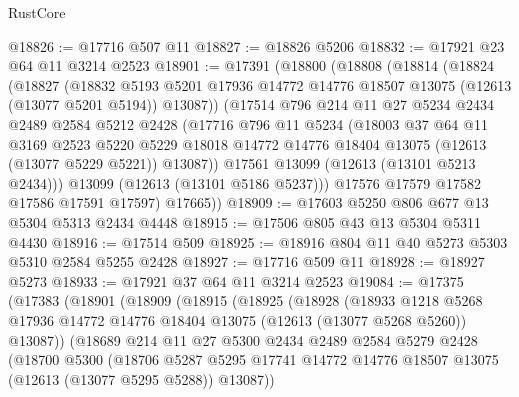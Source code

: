 \begin{lexlean}{RustCore}
\begin{coremodule}
@18826 := @17716 @507 @11
@18827 := @18826 @5206
@18832 := @17921 @23 @64 @11 @3214 @2523
@18901 := @17391
    (@18800
      (@18808
        (@18814
          (@18824
            (@18827
              (@18832
                @5193
                @5201
                @17936
                @14772
                @14776
                @18507
                @13075
                (@12613 (@13077 @5201 @5194))
                @13087))
            (@17514
              @796
              @214
              @11
              @27
              @5234
              @2434
              @2489
              @2584
              @5212
              @2428
              (@17716
                @796
                @11
                @5234
                (@18003
                  @37
                  @64
                  @11
                  @3169
                  @2523
                  @5220
                  @5229
                  @18018
                  @14772
                  @14776
                  @18404
                  @13075
                  (@12613 (@13077 @5229 @5221))
                  @13087))
              @17561
              @13099
              (@12613 (@13101 @5213 @2434)))
            @13099
            (@12613 (@13101 @5186 @5237)))
          @17576
          @17579
          @17582
          @17586
          @17591
          @17597)
        @17665))
@18909 := @17603 @5250 @806 @677 @13 @5304 @5313 @2434 @4448
@18915 := @17506 @805 @43 @13 @5304 @5311 @4430
@18916 := @17514 @509
@18925 := @18916 @804 @11 @40 @5273 @5303 @5310 @2584 @5255 @2428
@18927 := @17716 @509 @11
@18928 := @18927 @5273
@18933 := @17921 @37 @64 @11 @3214 @2523
@19084 := @17375
    (@17383
      (@18901
        (@18909
          (@18915
            (@18925
              (@18928
                (@18933
                  @1218
                  @5268
                  @17936
                  @14772
                  @14776
                  @18404
                  @13075
                  (@12613 (@13077 @5268 @5260))
                  @13087))
              (@18689
                @214
                @11
                @27
                @5300
                @2434
                @2489
                @2584
                @5279
                @2428
                (@18700
                  @5300
                  (@18706
                    @5287
                    @5295
                    @17741
                    @14772
                    @14776
                    @18507
                    @13075
                    (@12613 (@13077 @5295 @5288))
                    @13087))

\end{coremodule}
\end{lexlean}
